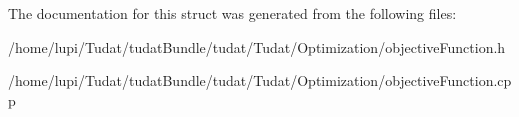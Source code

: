 The documentation for this struct was generated from the following files\+:\begin{DoxyCompactItemize}
\item 
/home/lupi/\+Tudat/tudat\+Bundle/tudat/\+Tudat/\+Optimization/objective\+Function.\+h\item 
/home/lupi/\+Tudat/tudat\+Bundle/tudat/\+Tudat/\+Optimization/objective\+Function.\+cpp\end{DoxyCompactItemize}
